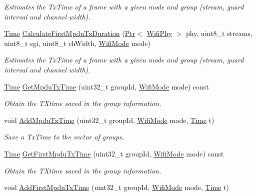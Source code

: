 \begin{DoxyCompactItemize}
\begin{DoxyCompactList}\small\item\em Estimates the Tx\+Time of a frame with a given mode and group (stream, guard interval and channel width). \end{DoxyCompactList}\item 
\hyperlink{classns3_1_1Time}{Time} \hyperlink{classns3_1_1MinstrelHtWifiManager_aebde711921cb34ee3bfbe9801e76ae2e}{Calculate\+First\+Mpdu\+Tx\+Duration} (\hyperlink{classns3_1_1Ptr}{Ptr}$<$ \hyperlink{classns3_1_1WifiPhy}{Wifi\+Phy} $>$ phy, uint8\+\_\+t streams, uint8\+\_\+t sgi, uint8\+\_\+t ch\+Width, \hyperlink{classns3_1_1WifiMode}{Wifi\+Mode} mode)
\begin{DoxyCompactList}\small\item\em Estimates the Tx\+Time of a frame with a given mode and group (stream, guard interval and channel width). \end{DoxyCompactList}\item 
\hyperlink{classns3_1_1Time}{Time} \hyperlink{classns3_1_1MinstrelHtWifiManager_a10e963727034a88092842510c5fc21bc}{Get\+Mpdu\+Tx\+Time} (uint32\+\_\+t group\+Id, \hyperlink{classns3_1_1WifiMode}{Wifi\+Mode} mode) const 
\begin{DoxyCompactList}\small\item\em Obtain the T\+Xtime saved in the group information. \end{DoxyCompactList}\item 
void \hyperlink{classns3_1_1MinstrelHtWifiManager_a3ce7d66218d851e645c2f4775e7b8a91}{Add\+Mpdu\+Tx\+Time} (uint32\+\_\+t group\+Id, \hyperlink{classns3_1_1WifiMode}{Wifi\+Mode} mode, \hyperlink{classns3_1_1Time}{Time} t)
\begin{DoxyCompactList}\small\item\em Save a Tx\+Time to the vector of groups. \end{DoxyCompactList}\item 
\hyperlink{classns3_1_1Time}{Time} \hyperlink{classns3_1_1MinstrelHtWifiManager_a53308ad39a550d0972aad572b3566ec5}{Get\+First\+Mpdu\+Tx\+Time} (uint32\+\_\+t group\+Id, \hyperlink{classns3_1_1WifiMode}{Wifi\+Mode} mode) const 
\begin{DoxyCompactList}\small\item\em Obtain the T\+Xtime saved in the group information. \end{DoxyCompactList}\item 
void \hyperlink{classns3_1_1MinstrelHtWifiManager_a4e42c7189837e6b28544c18327990ab9}{Add\+First\+Mpdu\+Tx\+Time} (uint32\+\_\+t group\+Id, \hyperlink{classns3_1_1WifiMode}{Wifi\+Mode} mode, \hyperlink{classns3_1_1Time}{Time} t)

\end{DoxyCompactItemize}
